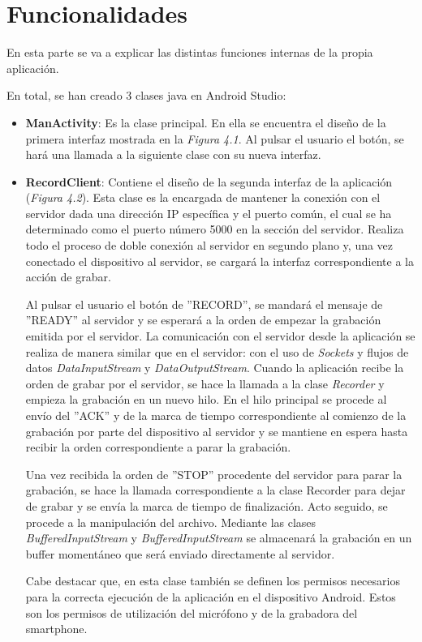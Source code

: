 \documentclass[a4paper,11pt]{book}
\begin{document}
	\section{Funcionalidades}
	En esta parte se va a explicar las distintas funciones internas de la propia aplicación.
	
	En total, se han creado 3 clases java en Android Studio:
	\begin{itemize}
	\item \textbf{ManActivity}: Es la clase principal. En ella se encuentra el diseño de la primera interfaz mostrada en la \textit{Figura 4.1}. Al pulsar el usuario el botón, se hará una llamada a la siguiente clase con su nueva interfaz.
	\item \textbf{RecordClient}: Contiene el diseño de la segunda interfaz de la aplicación (\textit{Figura 4.2}). Esta clase es la encargada de mantener la conexión con el servidor dada una dirección IP específica y el puerto común, el cual se ha determinado como el puerto número 5000 en la sección del servidor. Realiza todo el proceso de doble conexión al servidor en segundo plano y, una vez conectado el dispositivo al servidor, se cargará la interfaz correspondiente a la acción de grabar.
	
	Al pulsar el usuario el botón de ''RECORD'', se mandará el mensaje de ''READY'' al servidor y se esperará a la orden de empezar la grabación emitida por el servidor. La comunicación con el servidor desde la aplicación se realiza de manera similar que en el servidor: con el uso de \textit{Sockets} y flujos de datos \textit{DataInputStream} y \textit{DataOutputStream}. Cuando la aplicación recibe la orden de grabar por el servidor, se hace la llamada a la clase \textit{Recorder} y empieza la grabación en un nuevo hilo. En el hilo principal se procede al envío del ''ACK'' y de la marca de tiempo correspondiente al comienzo de la grabación por parte del dispositivo al servidor y se mantiene en espera hasta recibir la orden correspondiente a parar la grabación.
	
	Una vez recibida la orden de ''STOP'' procedente del servidor para parar la grabación, se hace la llamada correspondiente a la clase Recorder para dejar de grabar y se envía la marca de tiempo de finalización. Acto seguido, se procede a la manipulación del archivo. Mediante las clases \textit{BufferedInputStream} y \textit{BufferedInputStream} se almacenará la grabación en un buffer momentáneo que será enviado directamente al servidor.
	
	Cabe destacar que, en esta clase también se definen los permisos necesarios para la correcta ejecución de la aplicación en el dispositivo Android. Estos son los permisos de utilización del micrófono y de la grabadora del smartphone.
	

\end{itemize}
\end{document}
